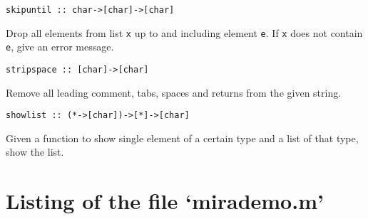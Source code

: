 \documentclass{article}
\newenvironment{listing}{\small\begin{flushleft}}{\end{flushleft}}
\newenvironment{desc}{\nopagebreak\vspace{-\bigskipamount}\vspace{-\parskip}\begin{list}{}{\setlength{\topsep}{0pt}\setlength{\rightmargin}{0pt}}\item[]}{\end{list}}
\begin{document}
\begin{verbatim}
skipuntil :: char->[char]->[char]
\end{verbatim}
\begin{desc}
Drop all elements from list {\tt x} up to and including element {\tt e}.
If {\tt x} does not contain {\tt e},
give an error message.
\end{desc}
\begin{verbatim}
stripspace :: [char]->[char]
\end{verbatim}
\begin{desc}
Remove all leading comment, tabs, spaces and returns from the
given string.
\end{desc}
\begin{verbatim}
showlist :: (*->[char])->[*]->[char]
\end{verbatim}
\begin{desc}
Given a function to show single element of a certain type and a list
of that type, show the list.
\end{desc}
\appendix
\section{Listing of the file `mirademo.m'}
\label{sec:democode}
\begin{listing}

\end{listing}
\printindex
\end{document}
